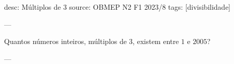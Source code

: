 desc:  Múltiplos de $3$
source:  OBMEP N2 F1 2023/8
tags:  [divisibilidade]

---

Quantos números inteiros, múltiplos de $3$, existem entre $1$ e $2005$?

---
